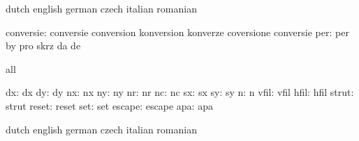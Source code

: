 
\startvariables            dutch                     english
                           german                    czech
                           italian                   romanian

                conversie: conversie                 conversion
                           konversion                konverze
                           coversione                conversie
                      per: per                       by
                           pro                       skrz
                           da                        de

\stopvariables




\startconstants            all

                       dx: dx
                       dy: dy
                       nx: nx
                       ny: ny
                       nr: nr
                       nc: nc
                       sx: sx
                       sy: sy
                        n: n
                     vfil: vfil
                     hfil: hfil
                    strut: strut
                    reset: reset
                      set: set
                   escape: escape
                      apa: apa

\stopconstants




\startvariables            dutch                     english
                           german                    czech
                           italian                   romanian

